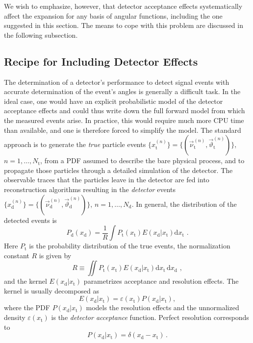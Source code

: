 \documentclass[aps,prd,reprint,nofootinbib,preprintnumbers]{revtex4}
\newcommand{\rmdx}[1]{\mbox{d} #1 \,} %
\newcommand{\subd}{_{\text{d}}}
\newcommand{\subt}{_{\text{t}}}
\renewcommand{\theta}{\vartheta}
\let\eps\varepsilon
\newcommand{\xd}{x\subd}
\newcommand{\xt}{x\subt}
\newcommand{\Ekernel}{E(\xd|\xt)}
\newcommand{\fred}[1]{{\color{brown!85!black}#1}}
\begin{document}
We wish to emphasize, however, that detector acceptance effects systematically affect the expansion for any basis
of angular functions, including the one suggested in this section. The means to cope with this problem are discussed
in the following subsection.


\subsection{Recipe for \fred{Including} Detector Effects}
\label{sec:systematics:acceptance}

The determination of a detector's performance to detect signal events
with accurate determination of the event's angles is generally a
difficult task. In the ideal case, one would have an explicit
probabilistic model of the detector acceptance effects and could thus
write down the full forward model from which the measured events
arise. In practice, this would require much more CPU time than
available, and one is therefore forced to simplify the model. The
standard approach is to generate the \emph{true} particle events
$\lbrace x_\text{t}^{(n)}\rbrace =
\lbrace(\vec{\nu}^{(n)}_\text{t},\vec\theta^{(n)}_\text{t})\rbrace$,
$n=1,\dots,N_\text{t}$, from a PDF assumed to describe the bare
physical process, and to propagate those particles through a detailed
simulation of the detector.  The observable traces that the particles
leave in the detector are fed into reconstruction algorithms resulting
in the \emph{detector} events $\lbrace x^{(n)}_\text{d}\rbrace =
\lbrace(\vec{\nu}^{(n)}_\text{d}, \vec\theta^{(n)}_\text{d})\rbrace$,
$n=1,\dots,N_\text{d}$.  In general, the distribution of the detected
events is
\begin{equation}
    P_\text{d}(x_\text{d}) = \frac{1}{R} \int P_\text{t}(x_\text{t}) E(x_\text{d} | x_\text{t}) \rmdx{x_\text{t}}\,.
\end{equation}
Here $P_\text{t}$ is the probability distribution of the true events,
the normalization constant $R$ is given by
\begin{equation}
    R \equiv \iint P_\text{t}(x_\text{t}) E(x_\text{d} | x_\text{t}) \rmdx{x_\text{t}} \rmdx{x_\text{d}}\,,
\end{equation}
and the kernel $E(x_\text{d}| x_\text{t})$ parametrizes acceptance and
resolution effects. The kernel is usually decomposed as
\begin{equation}
  \Ekernel = \eps(\xt) P(\xd|\xt),
\end{equation}
where the PDF $P(\xd|\xt)$ models the resolution effects and the
unnormalized density $\eps(\xt)$ is the \emph{detector acceptance}
function. Perfect resolution corresponds to
\begin{equation}
  \label{eq:def-R}
  P(\xd|\xt) = \delta(\xd - \xt) \,.
\end{equation}
\end{document}
